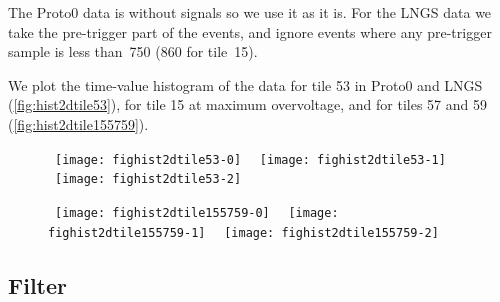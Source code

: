 
The Proto0 data is without signals so we use it as it is. For the LNGS data
we take the pre-trigger part of the events, and ignore events where any
pre-trigger sample is less than~750 (860 for tile~15).

We plot the time-value histogram of the data for tile 53 in Proto0 and LNGS
(\autoref{fig:hist2dtile53}), for tile 15 at maximum overvoltage, and for
tiles 57 and 59 (\autoref{fig:hist2dtile155759}).



\begin{figure}
    
    \mbox{
    \hspace{-0.20\textwidth}
    \texttt{[image: fighist2dtile53-0]}
    }
    \mbox{
    \hspace{-0.20\textwidth}
    \texttt{[image: fighist2dtile53-1]}
    }
    \mbox{
    \hspace{-0.20\textwidth}
    \texttt{[image: fighist2dtile53-2]}
    }
    
    
\end{figure}

\begin{figure}
    
    \mbox{
    \hspace{-0.20\textwidth}
    \texttt{[image: fighist2dtile155759-0]}
    }
    \mbox{
    \hspace{-0.20\textwidth}
    \texttt{[image: fighist2dtile155759-1]}
    }
    \mbox{
    \hspace{-0.20\textwidth}
    \texttt{[image: fighist2dtile155759-2]}
    }

    
\end{figure}

\subsection{Filter}

